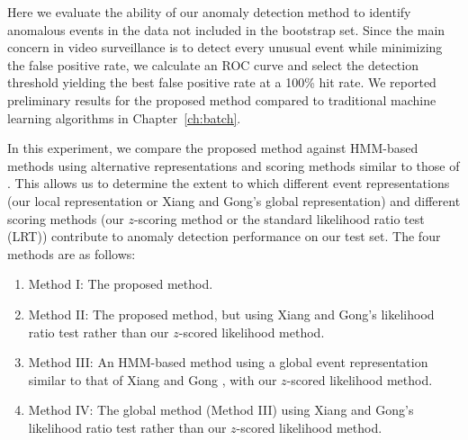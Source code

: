 Here we evaluate the ability of our anomaly detection method to
identify anomalous events in the data not included in the bootstrap
set. Since the main concern in video surveillance is to detect every
unusual event while minimizing the false positive rate, we calculate
an ROC curve and select the detection threshold yielding the best
false positive rate at a 100\% hit rate. We reported preliminary
results for the proposed method compared to traditional machine
learning algorithms in Chapter~\ref{ch:batch}.


In this experiment, we compare the proposed method against HMM-based
methods using alternative representations and scoring methods similar
to those of . This allows us to
determine the extent to which different event representations (our
local representation or Xiang and Gong's global representation) and
different scoring methods (our $z$-scoring method or the standard
likelihood ratio test (LRT)) contribute to anomaly detection
performance on our test set. The four methods are as follows:

\begin{enumerate}
  \item Method I: The proposed method.
  \item Method II: The proposed method, but using Xiang and Gong's
    likelihood ratio test  rather than
    our $z$-scored likelihood method.
  \item Method III: An HMM-based method using a global event
    representation similar to that of Xiang and Gong , with our
    $z$-scored likelihood method.
  \item Method IV: The global method (Method III) using Xiang and
    Gong's likelihood ratio test rather than our $z$-scored likelihood
    method.
\end{enumerate}


